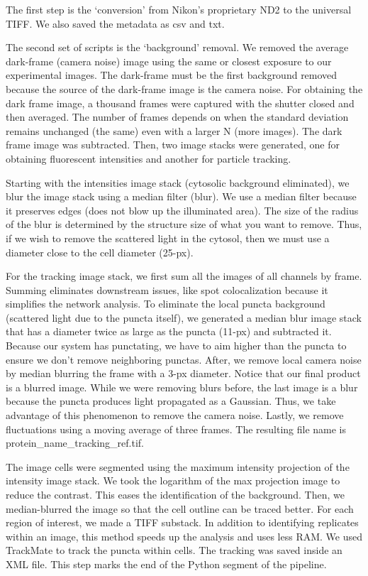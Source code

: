 The first step is the ‘conversion’ from Nikon's proprietary ND2 to the universal TIFF. We also saved the metadata as csv and txt.

The second set of scripts is the ‘background’ removal. We removed the average dark-frame (camera noise) image using the same or closest exposure to our experimental images. The dark-frame must be the first background removed because the source of the dark-frame image is the camera noise. For obtaining the dark frame image, a thousand frames were captured with the shutter closed and then averaged. The number of frames depends on when the standard deviation remains unchanged (the same) even with a larger N (more images). The dark frame image was subtracted. Then, two image stacks were generated, one for obtaining fluorescent intensities and another for particle tracking.

Starting with the intensities image stack (cytosolic background eliminated), we blur the image stack using a median filter (blur). We use a median filter because it preserves edges (does not blow up the illuminated area). The size of the radius of the blur is determined by the structure size of what you want to remove. Thus, if we wish to remove the scattered light in the cytosol, then we must use a diameter close to the cell diameter (25-px).

For the tracking image stack, we first sum all the images of all channels by frame. Summing eliminates downstream issues, like spot colocalization because it simplifies the network analysis. To eliminate the local puncta background (scattered light due to the puncta itself), we generated a median blur image stack that has a diameter twice as large as the puncta (11-px) and subtracted it. Because our system has punctating, we have to aim higher than the puncta to ensure we don’t remove neighboring punctas. After, we remove local camera noise by median blurring the frame with a 3-px diameter. Notice that our final product is a blurred image. While we were removing blurs before, the last image is a blur because the puncta produces light propagated as a Gaussian. Thus, we take advantage of this phenomenon to remove the camera noise. Lastly, we remove fluctuations using a moving average of three frames. The resulting file name is protein\_name\_tracking\_ref.tif.

The image cells were segmented using the maximum intensity projection of the intensity image stack. We took the logarithm of the max projection image to reduce the contrast. This eases the identification of the background. Then, we median-blurred the image so that the cell outline can be traced better. For each region of interest, we made a TIFF substack. In addition to identifying replicates within an image, this method speeds up the analysis and uses less RAM. We used TrackMate to track the puncta within cells. The tracking was saved inside an XML file. This step marks the end of the Python segment of the pipeline.

